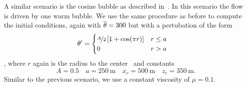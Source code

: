 A similar scenario is the cosine bubble as described in~\cite{giraldo2008study}.
In this scenario the flow is driven by one warm bubble.
We use the same procedure as before to compute the initial conditions, again with $\overline{\theta} = 300$ but with a pertubation of the form
\begin{align}
  \label{eq:cos-pertubation}
  \theta' &= \begin{cases}
    \nicefrac{A}{2} \left[ 1 + \cos(\pi r) \right] & r \leq a \\
    0 & r > a
    \end{cases}
\end{align},
where $r$ again is the radius to the center~ and constants
\begin{equation}\label{eq:density-bubble}
  A = 0.5 \quad a = \SI{250}{\m} \quad x_c = \SI{500}{\m} \quad z_c = \SI{350}{\m}.
\end{equation}
Similar to the previous scenario, we use a constant viscosity of $\mu = 0.1$.

